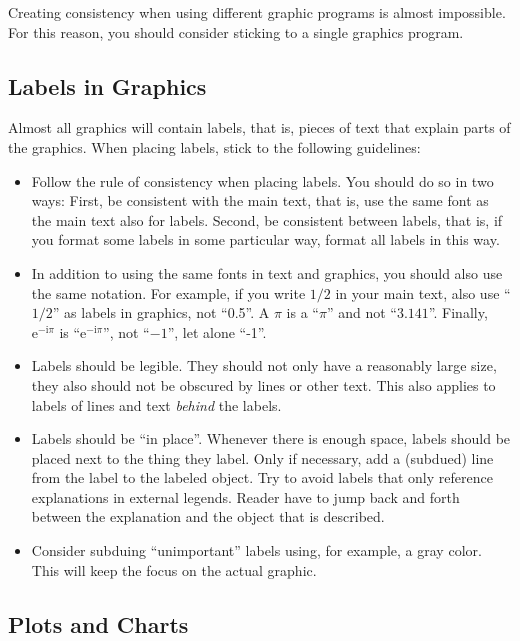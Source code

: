 Creating consistency when using different graphic programs is almost
impossible. For this reason, you should consider sticking to a single graphics
program.


\subsection{Labels in Graphics}

Almost all graphics will contain labels, that is, pieces of text that explain
parts of the graphics. When placing labels, stick to the following guidelines:
%
\begin{itemize}
    \item Follow the rule of consistency when placing labels. You should do
        so in two ways: First, be consistent with the main text, that is, use
        the same font as the main text also for labels. Second, be consistent
        between labels, that is, if you format some labels in some particular
        way, format all labels in this way.
    \item In addition to using the same fonts in text and graphics, you
        should also use the same notation. For example, if you write $1/2$ in
        your main text, also use ``$1/2$'' as labels in graphics, not
        ``0.5''. A $\pi$ is a ``$\pi$'' and not ``$3.141$''. Finally,
        $\mathrm e^{-\mathrm i \pi}$ is ``$\mathrm e^{-\mathrm i \pi}$'', not
        ``$-1$'', let alone ``-1''.
    \item Labels should be legible. They should not only have a reasonably
        large size, they also should not be obscured by lines or other text.
        This also applies to labels of lines and text \emph{behind} the
        labels.
    \item Labels should be ``in place''. Whenever there is enough space,
        labels should be placed next to the thing they label. Only if
        necessary, add a (subdued) line from the label to the labeled object.
        Try to avoid labels that only reference explanations in external
        legends. Reader have to jump back and forth between the explanation and
        the object that is described.
    \item Consider subduing ``unimportant'' labels using, for example, a gray
        color. This will keep the focus on the actual graphic.
\end{itemize}


\subsection{Plots and Charts}

